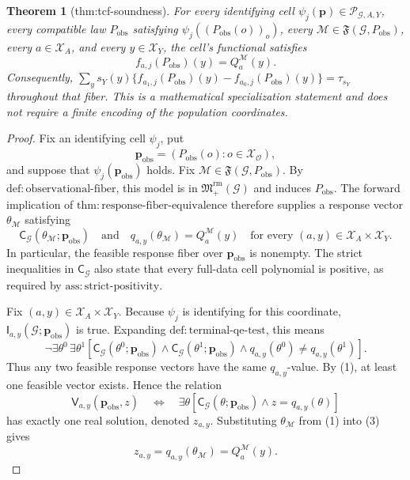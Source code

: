\documentclass{article}
\newtheorem{theorem}{Theorem}
\begin{document}
\begin{theorem}[thm:tcf-soundness]\label{thm:tcf-soundness}
For every identifying cell \(\psi_j(\mathbf p)\in\mathscr P_{\mathcal G,A,Y}\), every compatible law \(P_{\mathrm{obs}}\) satisfying \(\psi_j((P_{\mathrm{obs}}(o))_o)\), every \(\mathcal M\in\mathfrak F(\mathcal G,P_{\mathrm{obs}})\), every \(a\in\mathcal X_A\), and every \(y\in\mathcal X_Y\), the cell's functional satisfies \[f_{a,j}(P_{\mathrm{obs}})(y)=Q_a^{\mathcal M}(y).\] Consequently, \(\sum_y s_Y(y)\{f_{a_1,j}(P_{\mathrm{obs}})(y)-f_{a_0,j}(P_{\mathrm{obs}})(y)\}=\tau_{s_Y}\) throughout that fiber. This is a mathematical specialization statement and does not require a finite encoding of the population coordinates.
\end{theorem}
\begin{proof}
Fix an identifying cell \(\psi_j\), put
\[
\mathbf p_{\mathrm{obs}}=(P_{\mathrm{obs}}(o):o\in\mathcal X_{\mathcal O}),
\]
and suppose that \(\psi_j(\mathbf p_{\mathrm{obs}})\) holds.  Fix
\(\mathcal M\in\mathfrak F(\mathcal G,P_{\mathrm{obs}})\).  By
\(\mathrm{def{:}observational\text{-}fiber}\), this model is in
\(\mathfrak M_{+}^{\mathrm{rm}}(\mathcal G)\) and induces
\(P_{\mathrm{obs}}\).  The forward implication of
\(\mathrm{thm{:}response\text{-}fiber\text{-}equivalence}\) therefore supplies a response vector
\(\theta_{\mathcal M}\) satisfying
\[
\mathsf C_{\mathcal G}(\theta_{\mathcal M};\mathbf p_{\mathrm{obs}})
\quad\text{and}\quad
q_{a,y}(\theta_{\mathcal M})=Q_a^{\mathcal M}(y)
\quad
\text{for every }(a,y)\in\mathcal X_A\times\mathcal X_Y.
\tag{1}
\]
In particular, the feasible response fiber over \(\mathbf p_{\mathrm{obs}}\) is nonempty.  The strict inequalities in
\(\mathsf C_{\mathcal G}\) also state that every full-data cell polynomial is positive, as required by
\(\mathrm{ass{:}strict\text{-}positivity}\).

Fix \((a,y)\in\mathcal X_A\times\mathcal X_Y\).  Because \(\psi_j\) is identifying for this coordinate,
\(\mathsf I_{a,y}(\mathcal G;\mathbf p_{\mathrm{obs}})\) is true.  Expanding
\(\mathrm{def{:}terminal\text{-}qe\text{-}test}\), this means
\[
\neg\exists\theta^0\,\exists\theta^1
\left[
\mathsf C_{\mathcal G}(\theta^0;\mathbf p_{\mathrm{obs}})
\wedge
\mathsf C_{\mathcal G}(\theta^1;\mathbf p_{\mathrm{obs}})
\wedge
q_{a,y}(\theta^0)\ne q_{a,y}(\theta^1)
\right].
\tag{2}
\]
Thus any two feasible response vectors have the same \(q_{a,y}\)-value.  By (1), at least one feasible vector exists.  Hence the relation
\[
\mathsf V_{a,y}(\mathbf p_{\mathrm{obs}},z)
\quad\Longleftrightarrow\quad
\exists\theta\left[
\mathsf C_{\mathcal G}(\theta;\mathbf p_{\mathrm{obs}})
\wedge z=q_{a,y}(\theta)
\right]
\tag{3}
\]
has exactly one real solution, denoted \(z_{a,y}\).  Substituting \(\theta_{\mathcal M}\) from (1) into (3) gives
\[
z_{a,y}=q_{a,y}(\theta_{\mathcal M})=Q_a^{\mathcal M}(y).
\tag{4}
\]


\end{proof}
\end{document}
